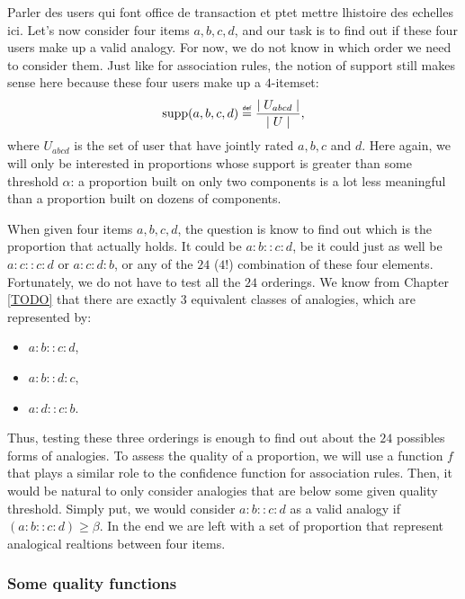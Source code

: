 Parler des users qui font office de transaction et ptet mettre lhistoire des
echelles ici.
Let's now consider four items $a, b, c, d$, and our task is to find out if
these four users make up a valid analogy. For now, we do not know in which
order we need to consider them.  Just like for association rules, the notion of
support still makes sense here because these four users make up a $4$-itemset:
$$\supp(a, b, c, d) \eqdef \frac{\mid U_{abcd}\mid}{\mid U\mid},$$
where $U_{abcd}$ is the set of user that have jointly rated $a, b, c$ and $d$.
Here again, we will only be interested in proportions whose support is greater
than some threshold $\alpha$: a proportion built on only two components is a
lot less meaningful than a proportion built on dozens of components.

When given four items $a, b, c, d$, the question is know to find out which is
the proportion that actually holds. It could be $a:b::c:d$, be it could just as
well be $a:c::c:d$ or $a:c:d:b$, or any of the $24$ ($4!$) combination of these
four elements. Fortunately, we do not have to test all the $24$ orderings.
We know from Chapter \ref{TODO} that there are exactly 3 equivalent classes of
analogies, which are represented by:
\begin{itemize}
  \item $a:b::c:d$,
  \item $a:b::d:c$,
  \item $a:d::c:b$.
\end{itemize}
Thus, testing these three orderings is enough to find out about the $24$
possibles forms of analogies. To assess the quality of a proportion, we will
use a function $f$ that plays a similar role to the confidence function for
association rules. Then, it would be natural to only consider analogies that
are below some given quality threshold. Simply put, we would consider
$a:b::c:d$ as a valid analogy if $(a:b::c:d) \geq \beta$. In the end we are
left with a set of proportion that represent analogical realtions between four
items.

\subsubsection{Some quality functions}

